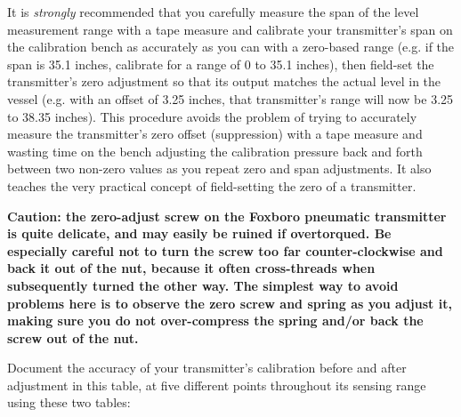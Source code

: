 It is {\it strongly} recommended that you carefully measure the span of the level measurement range with a tape measure and calibrate your transmitter's span on the calibration bench as accurately as you can with a zero-based range (e.g. if the span is 35.1 inches, calibrate for a range of 0 to 35.1 inches), then field-set the transmitter's zero adjustment so that its output matches the actual level in the vessel (e.g. with an offset of 3.25 inches, that transmitter's range will now be 3.25 to 38.35 inches).  This procedure avoids the problem of trying to accurately measure the transmitter's zero offset (suppression) with a tape measure and wasting time on the bench adjusting the calibration pressure back and forth between two non-zero values as you repeat zero and span adjustments.  It also teaches the very practical concept of field-setting the zero of a transmitter.

{\bf Caution: the zero-adjust screw on the Foxboro pneumatic transmitter is quite delicate, and may easily be ruined if overtorqued.  Be especially careful not to turn the screw too far counter-clockwise and back it out of the nut, because it often cross-threads when subsequently turned the other way.  The simplest way to avoid problems here is to observe the zero screw and spring as you adjust it, making sure you do not over-compress the spring and/or back the screw out of the nut.}

\filbreak

Document the accuracy of your transmitter's calibration before and after adjustment in this table, at five different points throughout its sensing range using these two tables:

\vskip 10pt

